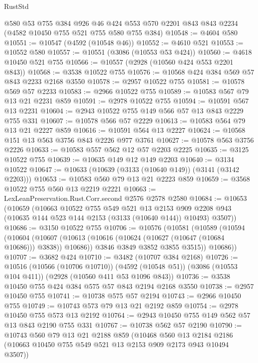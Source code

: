 \begin{lexlean}{RustStd}
\begin{coremodule}
    @580
    @53
    @755
    @384
    @926
    @46
    @424
    @553
    @570
    @2201
    @843
    @843
    @2234
    (@4582 @10450 @755 @521 @755 @580 @755 @384)
@10548 := @4604 @580
@10551 := @10547 (@4592 (@10548 @46))
@10552 := @4610 @521
@10553 := @10552 @580
@10557 := @10551 (@3086 (@10553 @53 @424))
@10560 := @4618 @10450 @521 @755
@10566 := @10557 (@2928 (@10560 @424 @553 @2201 @843))
@10568 := @3538 @10522 @755
@10576 := @10568 @424 @384 @569 @57 @843 @2233 @2168 @3550
@10578 := @2957 @10522 @755
@10581 := @10578 @569 @57 @2233
@10583 := @2966 @10522 @755
@10589 := @10583 @567 @79 @13 @21 @2231 @859
@10591 := @2978 @10522 @755
@10594 := @10591 @567 @13 @2231
@10604 := @2943 @10522 @755 @149 @566 @57 @13 @843 @2229 @755 @331
@10607 := @10578 @566 @57 @2229
@10613 := @10583 @564 @79 @13 @21 @2227 @859
@10616 := @10591 @564 @13 @2227
@10624 := @10568 @151 @13 @563 @3756 @843 @2226 @977 @3761
@10627 := @10578 @563 @3756 @2226
@10633 := @10583 @557 @562 @12 @57 @2203 @2225
@10635 := @3125 @10522 @755
@10639 := @10635 @149 @12 @149 @2203
@10640 := @3134 @10522
@10647 := @10633 (@10639 (@3133 (@10640 @149)) (@3141 (@3142 @2203)))
@10653 := @10583 @560 @79 @13 @21 @2223 @859
@10659 := @3568 @10522 @755 @560 @13 @2219 @2221
@10663 := LexLeanPreservation.Rust.Corr.second @2576 @2578 @2580
@10684 := @10653
    (@10659
      (@10663
        @10522
        @755
        @549
        @521
        @13
        @2153
        @909
        @2208
        @943
        (@10635 @144 @523 @144 @2153 (@3133 (@10640 @144)) @10493)
        @3507))
@10686 := @3150 @10522 @755
@10706 := @10576
    (@10581
      (@10589
        (@10594
          (@10604
            (@10607 (@10613 (@10616 (@10624 (@10627 (@10647 (@10684 @10686))) @3838)) @10686))
            @3846
            @3849
            @3852
            @3855
            @3515))
        @10686))
@10707 := @3682 @424
@10710 := @3482 (@10707 @384 @2168)
@10726 := @10516
    (@10566 (@10706 @10710))
    (@4592 (@10548 @51))
    (@3086 (@10553 @104 @411))
    (@2928 (@10560 @411 @53 @1096 @843))
@10736 := @3538 @10450 @755 @424 @384 @575 @57 @843 @2194 @2168 @3550
@10738 := @2957 @10450 @755
@10741 := @10738 @575 @57 @2194
@10743 := @2966 @10450 @755
@10749 := @10743 @573 @79 @13 @21 @2192 @859
@10754 := @2978 @10450 @755 @573 @13 @2192
@10764 := @2943 @10450 @755 @149 @562 @57 @13 @843 @2190 @755 @331
@10767 := @10738 @562 @57 @2190
@10790 := @10743
    @560
    @79
    @13
    @21
    @2188
    @859
    (@10468
      @560
      @13
      @2184
      @2186
      (@10663 @10450 @755 @549 @521 @13 @2153 @909 @2173 @943 @10494 @3507))

\end{coremodule}
\end{lexlean}
